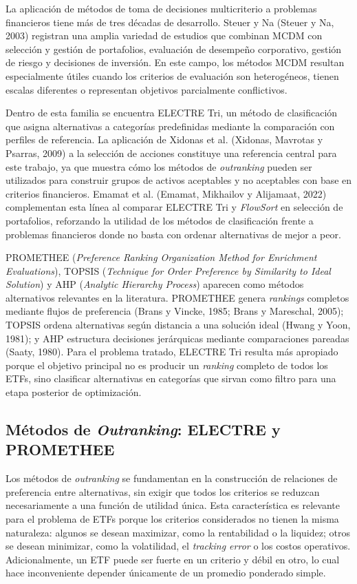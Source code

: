 \documentclass[12pt,letterpaper]{article}
\begin{document}
La aplicación de métodos de toma de decisiones multicriterio a problemas financieros tiene más de tres décadas de desarrollo. Steuer y Na (Steuer y Na, 2003) registran una amplia variedad de estudios que combinan MCDM con selección y gestión de portafolios, evaluación de desempeño corporativo, gestión de riesgo y decisiones de inversión. En este campo, los métodos MCDM resultan especialmente útiles cuando los criterios de evaluación son heterogéneos, tienen escalas diferentes o representan objetivos parcialmente conflictivos.

Dentro de esta familia se encuentra ELECTRE Tri, un método de clasificación que asigna alternativas a categorías predefinidas mediante la comparación con perfiles de referencia. La aplicación de Xidonas et al. (Xidonas, Mavrotas y Psarras, 2009) a la selección de acciones constituye una referencia central para este trabajo, ya que muestra cómo los métodos de \textit{outranking} pueden ser utilizados para construir grupos de activos aceptables y no aceptables con base en criterios financieros. Emamat et al. (Emamat, Mikhailov y Alijamaat, 2022) complementan esta línea al comparar ELECTRE Tri y \textit{FlowSort} en selección de portafolios, reforzando la utilidad de los métodos de clasificación frente a problemas financieros donde no basta con ordenar alternativas de mejor a peor.

PROMETHEE (\textit{Preference Ranking Organization Method for Enrichment Evaluations}), TOPSIS (\textit{Technique for Order Preference by Similarity to Ideal Solution}) y AHP (\textit{Analytic Hierarchy Process}) aparecen como métodos alternativos relevantes en la literatura. PROMETHEE genera \textit{rankings} completos mediante flujos de preferencia (Brans y Vincke, 1985; Brans y Mareschal, 2005); TOPSIS ordena alternativas según distancia a una solución ideal (Hwang y Yoon, 1981); y AHP estructura decisiones jerárquicas mediante comparaciones pareadas (Saaty, 1980). Para el problema tratado, ELECTRE Tri resulta más apropiado porque el objetivo principal no es producir un \textit{ranking} completo de todos los ETFs, sino clasificar alternativas en categorías que sirvan como filtro para una etapa posterior de optimización.



\subsection{Métodos de \textit{Outranking}: ELECTRE y PROMETHEE}

Los métodos de \textit{outranking} se fundamentan en la construcción de relaciones de preferencia entre alternativas, sin exigir que todos los criterios se reduzcan necesariamente a una función de utilidad única. Esta característica es relevante para el problema de ETFs porque los criterios considerados no tienen la misma naturaleza: algunos se desean maximizar, como la rentabilidad o la liquidez; otros se desean minimizar, como la volatilidad, el \textit{tracking error} o los costos operativos. Adicionalmente, un ETF puede ser fuerte en un criterio y débil en otro, lo cual hace inconveniente depender únicamente de un promedio ponderado simple.
\end{document}
